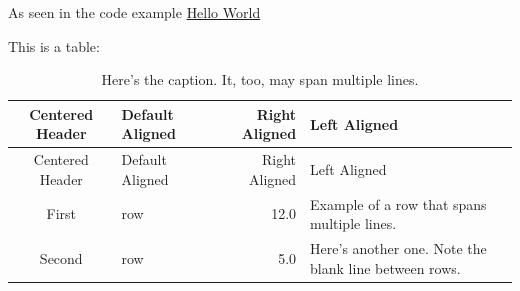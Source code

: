 \documentclass[12pt,12pt,a4paper,oneside,bibliography=totoc]{scrbook}
\begin{document}
As seen in the code example \hyperref[lst:codeSnippet]{Hello World}

This is a table:

\begin{longtable}[c]{@{}clrl@{}}
\caption{Here's the caption. It, too, may span multiple lines.
\label{my_table}}\tabularnewline
\toprule
\begin{minipage}[b]{0.15\columnwidth}\centering\strut
Centered Header
\strut\end{minipage} &
\begin{minipage}[b]{0.10\columnwidth}\raggedright\strut
Default Aligned
\strut\end{minipage} &
\begin{minipage}[b]{0.20\columnwidth}\raggedleft\strut
Right Aligned
\strut\end{minipage} &
\begin{minipage}[b]{0.31\columnwidth}\raggedright\strut
Left Aligned
\strut\end{minipage}\tabularnewline
\midrule
\endfirsthead
\toprule
\begin{minipage}[b]{0.15\columnwidth}\centering\strut
Centered Header
\strut\end{minipage} &
\begin{minipage}[b]{0.10\columnwidth}\raggedright\strut
Default Aligned
\strut\end{minipage} &
\begin{minipage}[b]{0.20\columnwidth}\raggedleft\strut
Right Aligned
\strut\end{minipage} &
\begin{minipage}[b]{0.31\columnwidth}\raggedright\strut
Left Aligned
\strut\end{minipage}\tabularnewline
\midrule
\endhead
\begin{minipage}[t]{0.15\columnwidth}\centering\strut
First
\strut\end{minipage} &
\begin{minipage}[t]{0.10\columnwidth}\raggedright\strut
row
\strut\end{minipage} &
\begin{minipage}[t]{0.20\columnwidth}\raggedleft\strut
12.0
\strut\end{minipage} &
\begin{minipage}[t]{0.31\columnwidth}\raggedright\strut
Example of a row that spans multiple lines.
\strut\end{minipage}\tabularnewline
\begin{minipage}[t]{0.15\columnwidth}\centering\strut
Second
\strut\end{minipage} &
\begin{minipage}[t]{0.10\columnwidth}\raggedright\strut
row
\strut\end{minipage} &
\begin{minipage}[t]{0.20\columnwidth}\raggedleft\strut
5.0
\strut\end{minipage} &
\begin{minipage}[t]{0.31\columnwidth}\raggedright\strut
Here's another one. Note the blank line between rows.
\strut\end{minipage}\tabularnewline
\bottomrule
\end{longtable}
\end{document}
